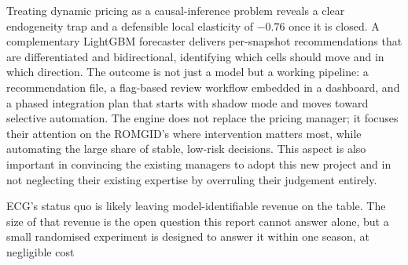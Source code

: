 \documentclass[11pt,a4paper]{article}
\begin{document}
Treating dynamic pricing as a causal-inference problem reveals a clear
endogeneity trap and a defensible local elasticity of $-0.76$ once it is
closed.  A complementary LightGBM forecaster delivers per-snapshot
recommendations that are differentiated and bidirectional, identifying which
cells should move and in which direction.  The outcome is not just a model
but a working pipeline: a recommendation file, a flag-based review workflow
embedded in a dashboard, and a phased integration plan that starts with shadow
mode and moves toward selective automation.  The engine does not replace the
pricing manager; it focuses their attention on the ROMGID's where intervention
matters most, while automating the large share of stable, low-risk decisions. This aspect is also important in convincing the existing managers to adopt this new project and in not neglecting their existing expertise by overruling their judgement entirely.
 
ECG's status quo is likely leaving model-identifiable revenue on the table.
The size of that revenue is the open question this report cannot answer alone,
but a small randomised experiment is designed to answer it within one season,
at negligible cost
\end{document}
